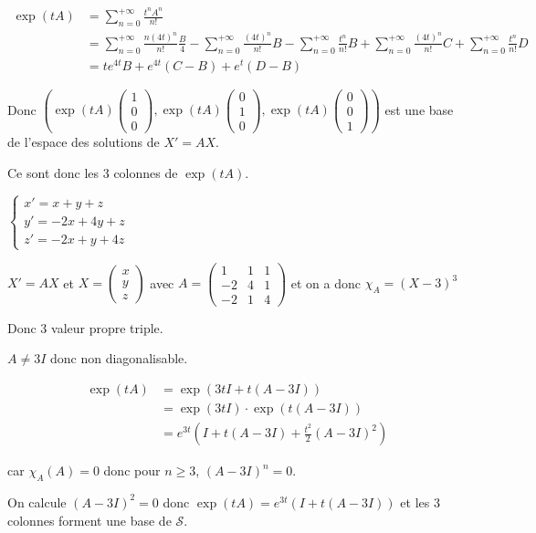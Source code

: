 \begin{exemple}
    \begin{align}
        \exp (tA) & = \sum_{n = 0}^{+ \infty} \frac{t^n A^n}{n!} \\
        & = \sum_{n = 0}^{+ \infty} \frac{n (4t)^n}{n!} \frac{B}{4} - \sum_{n = 0}^{+ \infty} \frac{(4t)^n}{n!} B - \sum_{n = 0}^{+ \infty} \frac{t^n}{n!} B + \sum_{n = 0}^{+ \infty} \frac{(4t)^n}{n!} C + \sum_{n = 0}^{+ \infty} \frac{t^n}{n!} D \\
        & = t e^{4t} B + e^{4t} (C - B) + e^t (D - B)
    \end{align}

    Donc $\left( \exp (tA) \begin{pmatrix}
    1 \\ 0 \\ 0
    \end{pmatrix}, \exp (tA) \begin{pmatrix}
    0 \\ 1 \\ 0
    \end{pmatrix}, \exp (tA) \begin{pmatrix}
    0 \\ 0 \\ 1
    \end{pmatrix} \right)$ est une base de l'espace des solutions de $X' = AX$.

    Ce sont donc les 3 colonnes de $\exp (tA)$. 
\end{exemple}

\begin{exemple}
    $\begin{cases}
        x' = x + y + z \\
        y' = -2x + 4y + z \\
        z' = -2x + y + 4z
    \end{cases}$

    $X' = AX$ et $X = \begin{pmatrix}
        x \\ y \\ z 
    \end{pmatrix}$ avec $A = \begin{pmatrix}
    1 & 1 & 1 \\
    -2 & 4 & 1 \\
    -2 & 1 & 4
    \end{pmatrix}$ et on a donc $\chi_A = (X - 3)^3$

    Donc 3 valeur propre triple. 

    $A \neq 3I$ donc non diagonalisable. 

    \begin{align}
        \exp(tA) & = \exp(3t I + t(A - 3I)) \\
        & = \exp(3t I) \cdot \exp(t(A - 3I)) \\
        & = e^{3t} (I + t(A - 3I) + \frac{t^2}{2} (A - 3I)^2)
    \end{align}

    car $\chi_A(A) = 0$ donc pour $n \geqslant 3$, $(A - 3I)^n = 0$.

    On calcule $(A - 3I)^2 = 0$ donc $\exp(tA) = e^{3t} (I + t(A - 3I))$ et les 3 colonnes 
    forment une base de $\mathscr S$. 
\end{exemple}

